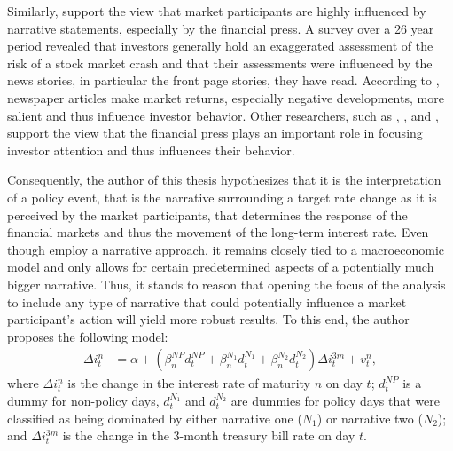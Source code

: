 \documentclass[11pt,a4paper,english,oneside]{book}
\numberwithin{equation}{chapter}
\begin{document}
Similarly, \cite{Goetzmann.2016} support the view that market participants are highly influenced by narrative statements, especially by the financial press. A survey over a 26 year period revealed that investors generally hold an exaggerated assessment of the risk of a stock market crash and that their assessments were influenced by the news stories, in particular the front page stories, they have read. %
According to \citeauthor{Goetzmann.2016}, newspaper articles make market returns, especially negative developments, more salient and thus influence investor behavior. Other researchers, such as \cite{Engelberg.2011}, \cite{Kraussl.2014}, and \cite{Yuan.2015}, support the view that the financial press plays an important role in focusing investor attention and thus influences their behavior.


Consequently, the author of this thesis hypothesizes that it is the interpretation of a policy event, that is the narrative surrounding a target rate change as it is perceived by the market participants, that determines the response of the financial markets and thus the movement of the long-term interest rate. Even though \cite{Ellingsen.2003} employ a narrative approach, it remains closely tied to a macroeconomic model and only allows for certain predetermined aspects of a potentially much bigger narrative. Thus, it stands to reason that opening the focus of the analysis to include any type of narrative that could potentially influence a market participant's action will yield more robust results. To this end, the author proposes the following model:
\begin{align}\label{reg2}
\Delta i^n_t &= \alpha + (\beta_n^{NP}d_t^{NP} + \beta_n^{N_1}d_t^{N_1} + \beta_n^{N_2}d_t^{N_2})\Delta i^{3m}_t + v_t^n,
\end{align}
where $\Delta i^n_t$ is the change in the interest rate of maturity $n$ on day $t$; $d_t^{NP}$ is a dummy for non-policy days, $d_t^{N_1}$ and $d_t^{N_2}$ are dummies for policy days that were classified as being dominated by either narrative one ($N_1$) or narrative two ($N_2$); and $\Delta i^{3m}_t$ is the change in the 3-month treasury bill rate on day $t$.
\end{document}

